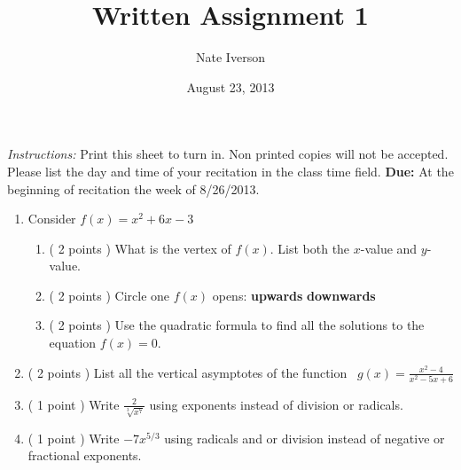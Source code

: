 \documentclass{quiz}
\title{Written Assignment 1}
\author{Nate Iverson}
\date{August 23, 2013} %
\begin{document}
\maketitle
\emph{Instructions:} Print this sheet to turn in. Non printed copies will not be accepted. Please list the day and time of your recitation  in the class time field. \textbf{Due:} At the beginning of recitation the week of 8/26/2013.
\begin{enumerate}
\item Consider $f(x)=x^2+6x-3$
\begin{enumerate}
\item ( 2 points ) What is the vertex of $f(x)$. List both the $x$-value and $y$-value.\\[.5in]
\item ( 2 points ) Circle one $f(x)$ opens: \hspace{.25in} \textbf{upwards} \hspace{.25in} \textbf{downwards}
\item ( 2 points ) Use the quadratic formula to find all the solutions to the equation $f(x)=0$.\\[.75in]
\end{enumerate}
\item ( 2 points ) List all the vertical asymptotes of the function \
$g(x)=\displaystyle \frac{x^2-4}{x^2-5x+6}$\\[1in]

\item ( 1 point ) Write $\displaystyle \frac{2}{\sqrt[3]{x^7}}$ using exponents instead of division or radicals.\\[1in]

\item ( 1 point ) Write $-7x^{5/3}$ using radicals and or division instead of negative or fractional exponents.
\end{enumerate}
\end{document}
